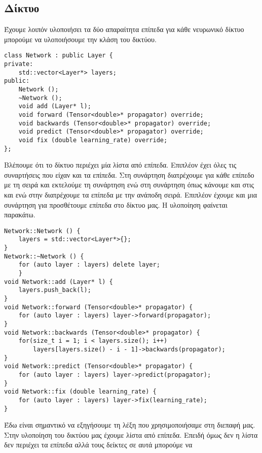 \subsection{Δίκτυο}
Έχουμε λοιπόν υλοποιήσει τα δύο απαραίτητα επίπεδα για κάθε νευρωνικό δίκτυο μπορούμε να υλοποιήσουμε την κλάση του δικτύου.
\begin{otherlanguage}{english}
\begin{lstlisting}[style=cppstyle,caption= Network layer in hpp file]
class Network : public Layer {
private:
    std::vector<Layer*> layers;
public:
    Network ();
    ~Network ();
    void add (Layer* l);
    void forward (Tensor<double>* propagator) override;
    void backwards (Tensor<double>* propagator) override;
    void predict (Tensor<double>* propagator) override;
    void fix (double learning_rate) override;
};
\end{lstlisting}
\end{otherlanguage}
Βλέπουμε ότι το δίκτυο περιέχει μία λίστα από επίπεδα. Επιπλέον έχει όλες τις συναρτήσεις που είχαν και τα επίπεδα. Στη συνάρτηση  διατρέχουμε για κάθε επίπεδο με τη σειρά και εκτελούμε τη συνάρτηση  ενώ στη συνάρτηση
όπως κάνουμε και στις  και  ενώ στην  διατρέχουμε τα επίπεδα με την ανάποδη σειρά. Επιπλέον έχουμε και μια συνάρτηση για προσθέτουμε επίπεδα στο δίκτυο μας. Η υλοποίηση φαίνεται παρακάτω.
\begin{otherlanguage}{english}
\begin{lstlisting}[style=cppstyle,caption= Network layer in cpp file]
Network::Network () {
    layers = std::vector<Layer*>{};
}
Network::~Network () {
    for (auto layer : layers) delete layer;
    }
void Network::add (Layer* l) {
    layers.push_back(l);
}
void Network::forward (Tensor<double>* propagator) {
    for (auto layer : layers) layer->forward(propagator);
}
void Network::backwards (Tensor<double>* propagator) {
    for(size_t i = 1; i < layers.size(); i++)
        layers[layers.size() - i - 1]->backwards(propagator);
}
void Network::predict (Tensor<double>* propagator) {
    for (auto layer : layers) layer->predict(propagator);
}
void Network::fix (double learning_rate) {
    for (auto layer : layers) layer->fix(learning_rate);
}
\end{lstlisting}
\end{otherlanguage}
Έδω είναι σημαντικό να εξηγήσουμε τη λέξη  που χρησιμοποιήσαμε στη διεπαφή μας. Στην υλοποίηση του δικτύου μας έχουμε λίστα από επίπεδα. Επειδή όμως δεν η λίστα δεν περιέχει τα επίπεδα αλλά τους δείκτες σε αυτά μπορούμε να
